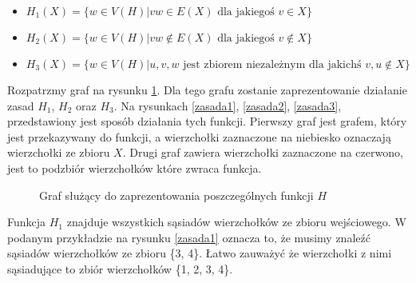 \begin{itemize}
    
  \item   $H_1(X) = \{ w \in V(H) | vw \in E(X) \textrm{ dla jakiegoś } v \in X \}$ 
  
  \item   $H_2(X) = \{ w \in V(H) | vw \notin E(X) \textrm{ dla jakiegoś } v \notin X\}$
  
  \item   $H_3(X) = \{ w \in V(H) | { u, v, w } \textrm{ jest zbiorem niezależnym dla jakichś } v, u \notin X\}$ 
\end{itemize}


Rozpatrzmy graf na rysunku \ref{zasada0}. Dla tego grafu zostanie zaprezentowanie działanie zasad  $H_1$,  $H_2$ oraz  $H_3$. Na rysunkach \ref{zasada1}, \ref{zasada2}, \ref{zasada3}, przedstawiony jest sposób działania tych funkcji. Pierwszy graf jest grafem, który jest przekazywany do funkcji, a wierzchołki zaznaczone na niebiesko oznaczają wierzchołki ze zbioru $X$. Drugi graf zawiera wierzchołki zaznaczone na czerwono, jest to podzbiór wierzchołków które zwraca funkcja.


 \begin{figure}[H]
  \centering
    \caption{Graf służący do zaprezentowania poszczególnych funkcji $H$}
 \label{zasada0}
 \end{figure}

Funkcja $H_1$ znajduje wszystkich sąsiadów wierzchołków ze zbioru wejściowego. W podanym przykładzie na rysunku \ref{zasada1} oznacza to, że musimy znaleźć sąsiadów wierzchołków ze zbioru \{3, 4\}. Łatwo zauważyć że wierzchołki z nimi sąsiadujące to zbiór wierzchołków \{1, 2, 3, 4\}.

